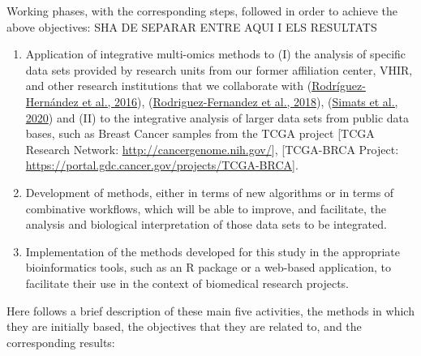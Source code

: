 \documentclass[a4paper, nobind]{templates/ociamthesis}
\begin{document}
Working phases, with the corresponding steps, followed in order to achieve the above objectives:
SHA DE SEPARAR ENTRE AQUI I ELS RESULTATS

\begin{enumerate}
\def\labelenumi{\arabic{enumi}.}
\item
  Application of integrative multi-omics methods to (I) the analysis of specific data sets provided by research units from our former affiliation center, VHIR, and other research institutions that we collaborate with (\protect\hyperlink{ref-rodriguez-hernandez_cinacalcet_2016}{Rodríguez-Hernández et al., 2016}), (\protect\hyperlink{ref-rodriguez-fernandez_phosphatidylserine-liposomes_2018}{Rodriguez-Fernandez et al., 2018}), (\protect\hyperlink{ref-simats_mouse_2020}{Simats et al., 2020}) and (II) to the integrative analysis of larger data sets from public data bases, such as Breast Cancer samples from the TCGA project {[}TCGA Research Network: \url{http://cancergenome.nih.gov/}{]}, {[}TCGA-BRCA Project: \url{https://portal.gdc.cancer.gov/projects/TCGA-BRCA}{]}.
\item
  Development of methods, either in terms of new algorithms or in terms of combinative workflows, which will be able to improve, and facilitate, the analysis and biological interpretation of those data sets to be integrated.
\item
  Implementation of the methods developed for this study in the appropriate bioinformatics tools, such as an R package or a web-based application, to facilitate their use in the context of biomedical research projects.
\end{enumerate}

Here follows a brief description of these main five activities, the methods in which they are initially based, the objectives that they are related to, and the corresponding results:
\end{document}
